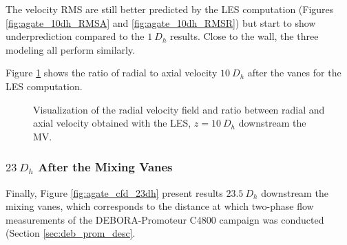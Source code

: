 \npar

The velocity RMS are still better predicted by the LES computation (Figures \ref{fig:agate_10dh_RMSA} and \ref{fig:agate_10dh_RMSR}) but start to show underprediction compared to the $1\ D_{h}$ results. Close to the wall, the three modeling all perform similarly.


\npar

Figure \ref{fig:ur_s_ua_10dh} shows the ratio of radial to axial velocity $10~D_{h}$ after the vanes for the LES computation.

\begin{figure}
\caption{Visualization of the radial velocity field and ratio between radial and axial velocity obtained with the LES, $z=10~D_{h}$ downstream the MV.}
\label{fig:ur_s_ua_10dh}
\end{figure}



\npar


\subsubsection{$23\ D_{h}$ After the Mixing Vanes}

Finally, Figure \ref{fig:agate_cfd_23dh} present results $23.5\ D_{h}$ downstream the mixing vanes, which corresponds to the distance at which two-phase flow measurements of the DEBORA-Promoteur C4800 campaign was conducted (Section \ref{sec:deb_prom_desc}.


